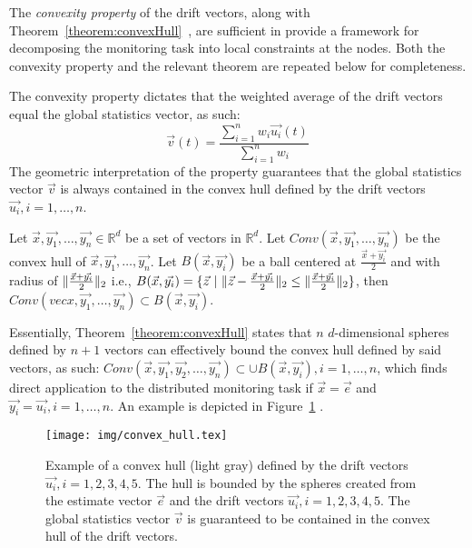 The \emph{convexity property} of the drift vectors, along with Theorem~\ref{theorem:convexHull}~\cite{Sharfman2006GM}, are sufficient in provide a framework for decomposing the monitoring task into local constraints at the nodes. Both the convexity property and the relevant theorem are repeated below for completeness.
	
The convexity property dictates that the weighted average of the drift vectors equal the global statistics vector, as such:
\begin{equation}
\vec{v}(t)=\frac{\sum_{i=1}^n {w_i\vec{u_i}(t)}}{\sum_{i=1}^n {w_i}}
\label{form:convexityProperty}
\end{equation}
The geometric interpretation of the property guarantees that the global statistics vector $\vec{v}$ is always contained in the convex hull defined by the drift vectors $\vec{u_i}, i=1,\dots,n$.


\begin{theorem}\label{theorem:convexHull}
Let $\vec{x}, \vec{y_1}, \dots, \vec{y_n} \in \mathbb{R}^d$ be a set of vectors in $\mathbb{R}^d$. Let $Conv(\vec{x}, \vec{y_1}, \dots, \vec{y_n})$ be the convex hull of $\vec{x}, \vec{y_1}, \dots, \vec{y_n}$. Let $B(\vec{x}, \vec{y_i})$ be a ball centered at $\frac{\vec{x}+\vec{y_i}}{2}$ and with radius of $\lVert\frac{\vec{x}+\vec{y_i}}{2}\rVert_2$ i.e., $B(\vec{x}, \vec{y_i})=\{\vec{z}\ |\ \norm{\vec{z}-\frac{\vec{x}+\vec{y_i}}{2}}_2 \leq \norm{\frac{\vec{x}+\vec{y_i}}{2}}_2 \}$, then $Conv(vec{x}, \vec{y_1}, \dots, \vec{y_n}) \subset B(\vec{x}, \vec{y_i})$.
\end{theorem}

Essentially, Theorem~\ref{theorem:convexHull} states that $n$ $d$-dimensional spheres defined by $n+1$ vectors can effectively bound the convex hull defined by said vectors, as such: $Conv(\vec{x}, \vec{y_1}, \vec{y_2}, \dots, \vec{y_n}) \subset  \cup B(\vec{x}, \vec{y_i}), i=1,\dots,n$, which finds direct application to the distributed monitoring task if $\vec{x}=\vec{e}$ and $\vec{y_i}=\vec{u_i}, i=1,\dots,n$. An example is depicted in Figure~\ref{fig:convexHull}
.


\begin{figure}[H]
\centering
\texttt{[image: img/convex\_hull.tex]}
\caption{Example of a convex hull (light gray) defined by the drift vectors $\vec{u_i}, i=1,2,3,4,5$. The hull is bounded by the spheres created from the estimate vector $\vec{e}$ and the drift vectors $\vec{u_i}, i=1,2,3,4,5$. The global statistics vector $\vec{v}$ is guaranteed to be contained in the convex hull of the drift vectors.} 
\label{fig:convexHull}
\end{figure}

